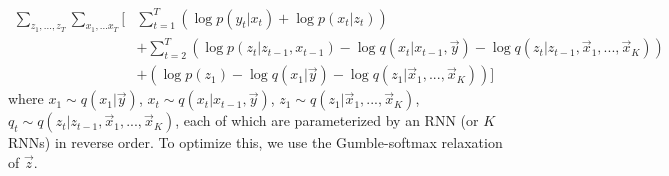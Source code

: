 \documentclass[12pt]{article}
\begin{document}
\begin{align}
    \sum_{z_1,...,z_T} \sum_{x_1,...x_T}[& \sum_{t=1}^T(\log p(y_t|x_t) + \log p(x_t|z_t)) \\
    & + \sum_{t=2}^T (\log p(z_t|z_{t-1},x_{t-1}) - \log q(x_t|x_{t-1},\vec{y}) - \log q(z_t|z_{t-1},\vec{x}_1, ..., \vec{x}_K)) \\
    & + (\log p(z_1) - \log q(x_1|\vec{y}) - \log q(z_1|\vec{x}_1, ..., \vec{x}_K))]
\end{align}
where $x_1 \sim q(x_1|\vec{y})$, $x_t \sim q(x_t|x_{t-1},\vec{y})$, $z_1 \sim q(z_1|\vec{x}_1, ..., \vec{x}_K)$, $q_t \sim q(z_t|z_{t-1},\vec{x}_1, ..., \vec{x}_K)$, each of which are parameterized by an RNN (or $K$ RNNs) in reverse order. To optimize this, we use the Gumble-softmax relaxation of $\vec{z}$.
\end{document}
